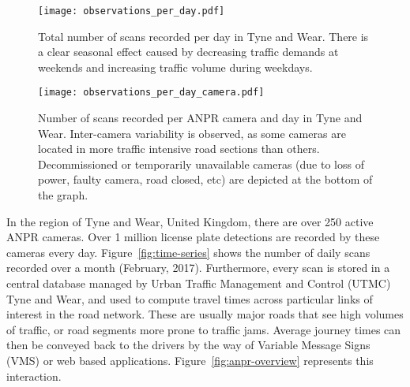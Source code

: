\begin{figure*}[t]
\centering
\begin{subfigure}[t]{.48\textwidth}
  \centering
  \texttt{[image: observations\_per\_day.pdf]}
  \caption{Total number of scans recorded per day in Tyne and Wear. There is a clear seasonal effect caused by decreasing traffic demands at weekends and increasing traffic volume during weekdays.}
  \label{fig:observations-per-day}
\end{subfigure}\hfill
\begin{subfigure}[t]{.48\textwidth}
  \centering
  \texttt{[image: observations\_per\_day\_camera.pdf]}
  \caption{Number of scans recorded per ANPR camera and day in Tyne and Wear. Inter-camera variability is observed, as some cameras are located in more traffic intensive road sections than others. Decommissioned or temporarily unavailable cameras (due to loss of power, faulty camera, road closed, etc) are depicted at the bottom of the graph.}
  \label{fig:observations-per-camera-day}
\end{subfigure}
\caption{License plate scans recorded by ANPR cameras during February 2017, in the region of Tyne and Wear, United Kingdom.}
\label{fig:time-series}
\end{figure*}

In the region of Tyne and Wear, United Kingdom, there are over 250 active ANPR cameras. Over 1 million license plate detections are recorded by these cameras every day. Figure~\ref{fig:time-series} shows the number of daily scans recorded over a month (February, 2017). Furthermore, every scan is stored in a central database managed by Urban Traffic Management and Control (UTMC) Tyne and Wear, and used to compute travel times across particular links of interest in the road network. These are usually major roads that see high volumes of traffic, or road segments more prone to traffic jams. Average journey times can then be conveyed back to the drivers by the way of Variable Message Signs (VMS) or web based applications. Figure~\ref{fig:anpr-overview} represents this interaction.


